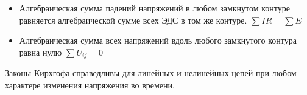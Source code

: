 \begin{itemize}
\item
	Алгебраическая сумма падений напряжений в любом замкнутом контуре равняется алгебраической сумме всех ЭДС в том же контуре.
	$\sum I R = \sum E $
\item
	Алгебраическая сумма всех напряжений вдоль любого замкнутого контура равна нулю
	$\sum U_{ij} = 0 $
\end{itemize}

Законы Кирхгофа справедливы для линейных  и нелинейных цепей при любом характере изменения напряжения во времени.

\pagebreak